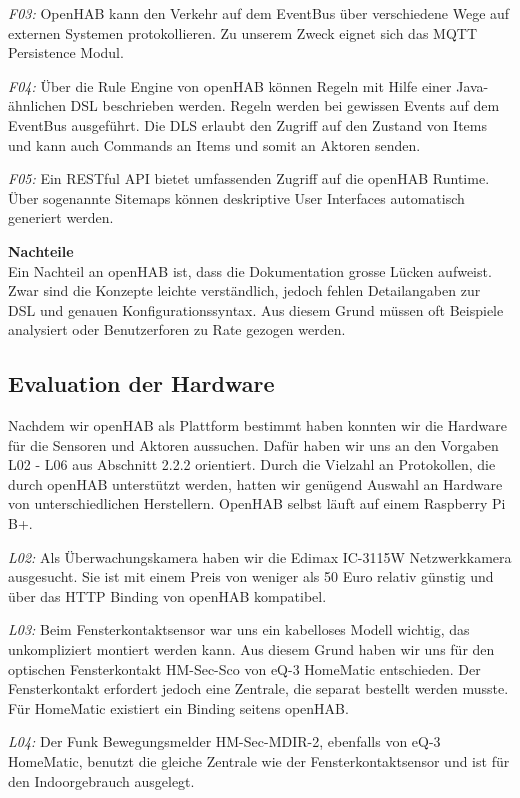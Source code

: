 \textit{F03:} OpenHAB kann den Verkehr auf dem EventBus über verschiedene Wege auf externen Systemen protokollieren. Zu unserem Zweck eignet sich das MQTT Persistence Modul.

\textit{F04:} Über die Rule Engine von openHAB können Regeln mit Hilfe einer Java-ähnlichen DSL beschrieben werden. Regeln werden bei gewissen Events auf dem EventBus ausgeführt. Die DLS erlaubt den Zugriff auf den Zustand von Items und kann auch Commands an Items und somit an Aktoren senden.

\textit{F05:} Ein RESTful API bietet umfassenden Zugriff auf die openHAB Runtime. Über sogenannte Sitemaps können deskriptive User Interfaces automatisch generiert werden.



\textbf{Nachteile} \\
Ein Nachteil an openHAB ist, dass die Dokumentation grosse Lücken aufweist. Zwar sind die Konzepte leichte verständlich, jedoch fehlen Detailangaben zur DSL und genauen Konfigurationssyntax. Aus diesem Grund müssen oft Beispiele analysiert oder Benutzerforen zu Rate gezogen werden.

\subsection{Evaluation der Hardware}
Nachdem wir openHAB als Plattform bestimmt haben konnten wir die Hardware für die Sensoren und Aktoren aussuchen. Dafür haben wir uns an den Vorgaben L02 - L06 aus Abschnitt 2.2.2 orientiert. Durch die Vielzahl an Protokollen, die durch openHAB unterstützt werden, hatten wir genügend Auswahl an Hardware von unterschiedlichen Herstellern. OpenHAB selbst läuft auf einem Raspberry Pi B+.

\textit{L02:} Als Überwachungskamera haben wir die Edimax IC-3115W Netzwerkkamera ausgesucht. Sie ist mit einem Preis von weniger als 50 Euro relativ günstig und über das HTTP Binding von openHAB kompatibel.

\textit{L03:} Beim Fensterkontaktsensor war uns ein kabelloses Modell wichtig, das unkompliziert montiert werden kann. Aus diesem Grund haben wir uns für den optischen Fensterkontakt HM-Sec-Sco von eQ-3 HomeMatic entschieden. Der Fensterkontakt erfordert jedoch eine Zentrale, die separat bestellt werden musste. Für HomeMatic existiert ein Binding seitens openHAB.

\textit{L04:} Der Funk Bewegungsmelder HM-Sec-MDIR-2, ebenfalls von eQ-3 HomeMatic, benutzt die gleiche Zentrale wie der Fensterkontaktsensor und ist für den Indoorgebrauch ausgelegt.

